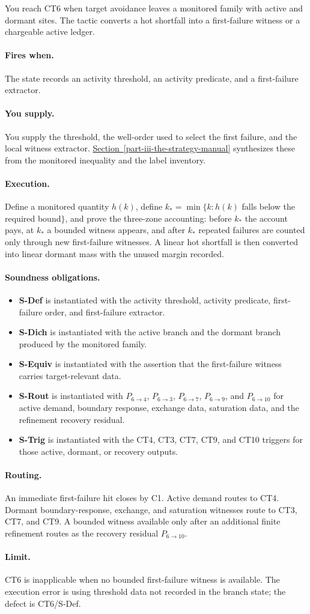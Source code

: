\documentclass[
  11pt,
]{article}
\providecommand{\tightlist}{%
  \setlength{\itemsep}{0pt}\setlength{\parskip}{0pt}}
\theoremstyle{definition}
\newcommand{\secref}[1]{\hyperref[#1]{Section~\ref*{#1}}}
\newcommand{\ctpar}[1]{\paragraph{#1.}}
\begin{document}
You reach CT6 when target avoidance leaves a monitored family with
active and dormant sites.  The tactic converts a hot shortfall into a
first-failure witness or a chargeable active ledger.

\ctpar{Fires when}
The state records an activity threshold, an activity predicate, and a
first-failure extractor.

\ctpar{You supply}
You supply the threshold, the well-order used to select the first
failure, and the local witness extractor.  \secref{part-iii-the-strategy-manual} synthesizes these
from the monitored inequality and the label inventory.

\ctpar{Execution}
Define a monitored quantity \(h(k)\), define
\(k_*=\min\{k:h(k)\) falls below the required bound\(\}\), and prove the
three-zone accounting: before \(k_*\) the account pays, at \(k_*\) a
bounded witness appears, and after \(k_*\) repeated failures are counted
only through new first-failure witnesses.  A linear hot shortfall is then
converted into linear dormant mass with the unused margin recorded.

\ctpar{Soundness obligations}
\begin{itemize}
\tightlist
\item \textbf{S-Def} is instantiated with the activity threshold, activity predicate, first-failure order, and first-failure extractor.
\item \textbf{S-Dich} is instantiated with the active branch and the dormant branch produced by the monitored family.
\item \textbf{S-Equiv} is instantiated with the assertion that the first-failure witness carries target-relevant data.
\item \textbf{S-Rout} is instantiated with \(P_{6\to4}\), \(P_{6\to3}\), \(P_{6\to7}\), \(P_{6\to9}\), and \(P_{6\to10}\) for active demand, boundary response, exchange data, saturation data, and the refinement recovery residual.
\item \textbf{S-Trig} is instantiated with the CT4, CT3, CT7, CT9, and CT10 triggers for those active, dormant, or recovery outputs.
\end{itemize}

\ctpar{Routing}
An immediate first-failure hit closes by C1.  Active demand routes to
CT4.  Dormant boundary-response, exchange, and saturation witnesses route
to CT3, CT7, and CT9.  A bounded witness available only after an
additional finite refinement routes as the recovery residual
\(P_{6\to10}\).

\ctpar{Limit}
CT6 is inapplicable when no bounded first-failure witness is available. The
execution error is using threshold data not recorded in the branch state;
the defect is CT6/S-Def.
\end{document}
